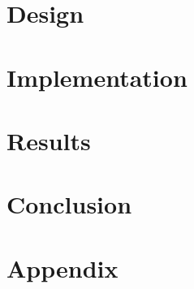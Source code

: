 






\newpage
\setcounter{tocdepth}{2}

\tableofcontents
\vfill


\vspace{1 cm}

\newpage


\section{Design}
\label{sec:design}


\section{Implementation}
\label{sec:implementation}






\section{Results}
\label{sec:results}





\section{Conclusion}
\label{sec:conclusion}




\newpage
\section{Appendix}
\label{sec:appendix}







